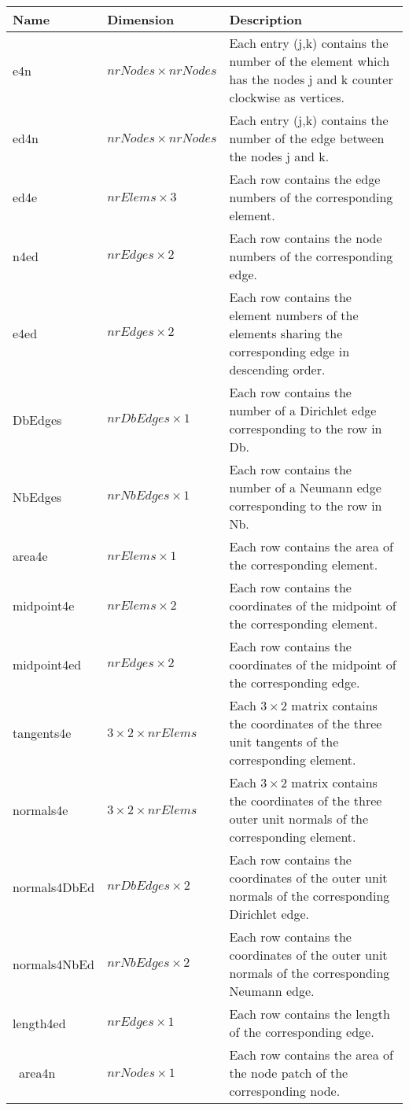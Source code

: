 \begin{longtable}{p{}p{}p{}}
Name&Dimension&Description\\ \hline
e4n&$nrNodes \times nrNodes$&Each entry (j,k) contains the number of the element which has the nodes j and k 
counter clockwise as vertices.\\
ed4n&$nrNodes \times nrNodes$&Each entry (j,k) contains the number of the edge between the nodes j and k.\\
ed4e&$nrElems \times 3$&Each row contains the edge numbers of the corresponding element.\\
n4ed&$nrEdges \times 2$&Each row contains the node numbers of the corresponding edge.\\
e4ed&$nrEdges \times 2$&Each row contains the element numbers of the elements sharing the corresponding edge 
in descending order.\\
DbEdges&$nrDbEdges \times 1$&Each row contains the number of a Dirichlet edge corresponding to the row in Db.\\
NbEdges&$nrNbEdges \times 1$&Each row contains the number of a Neumann edge corresponding to the row in Nb.\\
area4e&$nrElems \times 1$&Each row contains the area of the corresponding element.\\
midpoint4e&$nrElems \times 2$&Each row contains the coordinates of the midpoint of the corresponding element.\\
midpoint4ed&$nrEdges \times 2$&Each row contains the coordinates of the midpoint of the corresponding edge.\\
tangents4e&$3 \times 2 \times nrElems$&Each $3\times2$ matrix contains the coordinates of the three unit tangents of 
the corresponding element.\\
normals4e&$3 \times 2 \times nrElems$&Each $3\times2$ matrix contains the coordinates of the three outer unit normals of 
the corresponding element.\\
normals4DbEd&$nrDbEdges \times 2$&Each row contains the coordinates of the outer unit normals of 
the corresponding Dirichlet edge.\\
normals4NbEd&$nrNbEdges \times 2$&Each row contains the coordinates of the outer unit normals of 
the corresponding Neumann edge.\\
length4ed&$nrEdges \times 1$&Each row contains the length of the corresponding edge.\\\
area4n&$nrNodes \times 1$&Each row contains the area of the node patch of the corresponding node.\\

\end{longtable}
